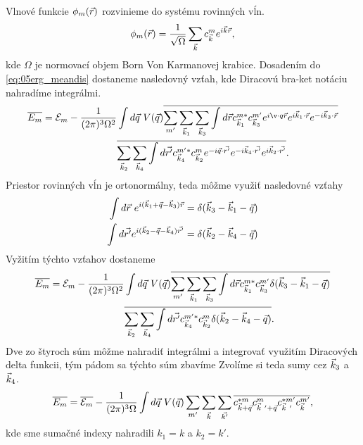 Vlnové funkcie $\phi_m(\vec{r})$ rozvinieme do systému rovinných vĺn. 
\begin{align}
\label{eq:05phi}
\phi_m(\vec{r}) = \frac{1}{\sqrt{\Omega}}\sum_{\vec{k}}c_{\vec{k}}^me^{i\vec{k}\vec{r}}\text{,}
\end{align}
kde $\Omega$ je normovací objem Born Von Karmanovej krabice. Dosadením do \eqref{eq:05erg_meandis} dostaneme nasledovný vzťah, kde Diracovú bra-ket notáciu nahradíme integrálmi.
\begin{align}
\notag
\overline{E_m} = \E_m - \frac{1}{(2\pi)^3\Omega^2}&\int d\vq\ V(\vq)\overline{ \sum_{m'} \sum_{\vk_1} \sum_{\vk_3}\int d\vr c^{m*}_{\vk_1}c^{m'}_{\vk_3}e^{i\v\cdot q\vr}e^{i\vk_1\cdot \vr}e^{-i\vk_3\cdot \vr}}\\
&\overline{\sum_{\vk_2}\sum_{\vk_4}\int d\vrp c^{m'*}_{\vk_4}c^{m}_{\vk_2}e^{-i\vq\cdot \vrp}e^{-i\vk_4\cdot \vrp}e^{i\vk_2\cdot \vrp}} \text{.}
\end{align}
Priestor rovinných vĺn je ortonormálny, teda môžme využiť nasledovné vzťahy
\begin{align*}
\int d\vec{r}\ e^{i(\vec{k}_1+\vec{q}-\vec{k}_3)\vec{r}}=\delta(\vec{k}_3-\vec{k}_1-\vec{q})\\ 
\int d\vec{r'} e^{i(\vec{k}_2-\vec{q}-\vec{k}_4)\vec{r'}}=\delta(\vec{k}_2-\vec{k}_4-\vec{q})
\end{align*}
Vyžitím týchto vzťahov dostaneme
\begin{align}
\notag
\overline{E_m} = \E_m - \frac{1}{(2\pi)^3\Omega^2}&\int d\vq\ V(\vq)\overline{ \sum_{m'} \sum_{\vk_1} \sum_{\vk_3}\int d\vr c^{m*}_{\vk_1}c^{m'}_{\vk_3}\delta(\vk_3-\vk_1-\vq)}\\
&\overline{\sum_{\vk_2}\sum_{\vk_4}\int d\vrp c^{m'*}_{\vk_4}c^{m}_{\vk_2}\delta(\vk_2-\vk_4-\vq)} \text{.}
\end{align} 
Dve zo štyroch súm môžme nahradiť integrálmi a integrovať využitím Diracových delta funkcii, tým pádom sa týchto súm zbavíme Zvolíme si teda sumy cez $\vec{k}_3$ a $\vec{k}_4$.
\begin{align}
\overline{E_m}=\overline{\E_m} - \frac{1}{(2\pi)^3\Omega}\int d\vq\ V(\vq) \sum_{m'}\sum_{\vk}\sum_{\vkp}\overline{c^{*m}_{\vk+\vq}c^{m}_{\vk\ '+\vq}c^{*m'}_{\vk\ '}c^{m'}_{\vk}}\text{,}
\end{align}
kde sme sumačné indexy nahradili $k_1=k$ a $k_2=k'$. 

